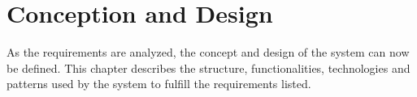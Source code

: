 \chapter{Conception and Design}
 \label{chapter:concept}

As the requirements are analyzed, the concept and design of the system can now be defined. This chapter describes the structure, functionalities, technologies and patterns used by the system to fulfill the requirements listed.




% 
